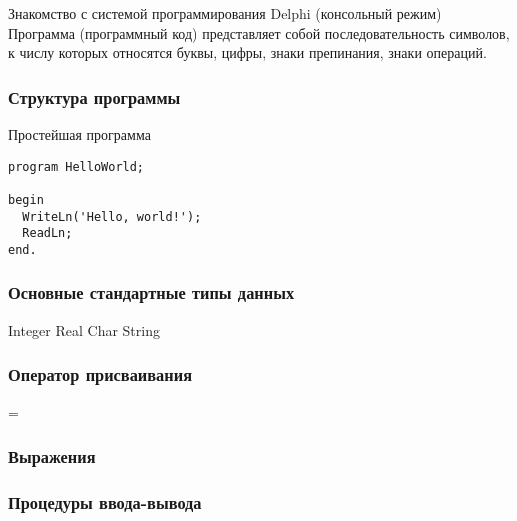 \documentclass[12pt,a4paper]{report}
\begin{document}
\parindent=1cm
\pagestyle{empty}

\lstset{ language=Pascal, basicstyle=\small\ttfamily, numbers=left, numberstyle=\tiny, stepnumber=1, numbersep=5pt, extendedchars=\true, showstringspaces=false, breakatwhitespace=true, frame=single, keepspaces=true }

\clearpage
Знакомство с системой программирования Delphi (консольный режим)
Программа (программный код) представляет собой последовательность символов, к числу которых относятся буквы, цифры, знаки препинания, знаки операций.


\subsubsection*{Структура программы}
Простейшая программа
\begin{verbatim}
program HelloWorld;

begin
  WriteLn('Hello, world!');
  ReadLn;
end.
\end{verbatim}


\subsubsection*{Основные стандартные типы данных}
Integer
Real
Char
String

\subsubsection*{Оператор присваивания}
=

\subsubsection*{Выражения}

\subsubsection*{Процедуры ввода-вывода}



\clearpage
\end{document}
